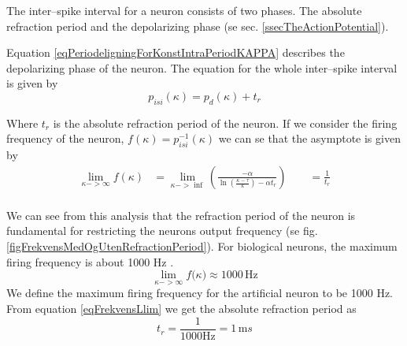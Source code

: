 

The inter--spike interval for a neuron consists of two phases. 
The absolute refraction period and the depolarizing phase (se sec. \ref{ssecTheActionPotential}).

Equation \eqref{eqPeriodeligningForKonstIntraPeriodKAPPA} describes the depolarizing phase of the neuron. %
The equation for the whole inter--spike interval is given by
\begin{equation}
	p_{isi}(\kappa) = p_d(\kappa) + t_r
	\label{eqHeilePerioden}
\end{equation}

Where $t_r$ is the absolute refraction period of the neuron. %
If we consider the firing frequency of the neuron, $f(\kappa) = p_{isi}^{-1}(\kappa)$ we can se that the asymptote is given by
\begin{equation}
	\begin{split}
		\lim_{\kappa->\infty}{ f(\kappa)} &= \lim_{\kappa->\inf}\left( \frac{-\alpha}{\ln \left( \frac{\kappa - \tau}{\kappa} \right) - \alpha t_r} \right)   \qquad = \frac{1}{t_r} \\ 
	\end{split}
	\label{eqFrekvensLlim} %
\end{equation}




We can see from this analysis that the refraction period of the neuron is fundamental for restricting the neurons output frequency (se fig. \ref{figFrekvensMedOgUtenRefractionPeriod}).
For biological neurons, the maximum firing frequency is about 1000 Hz \cite{NeuroscienceExploringTheBrain3edKAP4}. %
\begin{equation}
	\lim_{\kappa->\infty}{ f(\kappa}) \approx 1000 \, \text{Hz}
\end{equation}
We define the maximum firing frequency for the artificial neuron to be 1000 Hz. From equation \ref{eqFrekvensLlim} we get the absolute refraction period as
\begin{equation}
	t_r = \frac{1}{1000 \text{Hz}} = 1 \, \text{m}s %
\end{equation}

